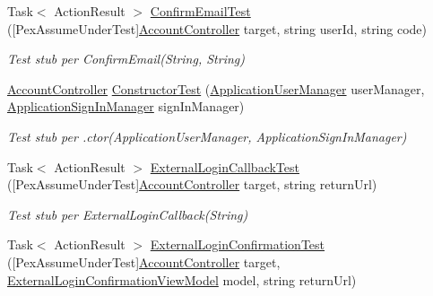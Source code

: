\begin{DoxyCompactItemize}
\item 
Task$<$ Action\+Result $>$ \mbox{\hyperlink{class_brew_day2_1_1_controllers_1_1_testsn_1_1_account_controller_test_a91de211f4957a161dd93f783b9146525}{Confirm\+Email\+Test}} (\mbox{[}Pex\+Assume\+Under\+Test\mbox{]}\mbox{\hyperlink{class_brew_day2_1_1_controllers_1_1_account_controller}{Account\+Controller}} target, string user\+Id, string code)
\begin{DoxyCompactList}\small\item\em Test stub per Confirm\+Email(\+String, String)\end{DoxyCompactList}\item 
\mbox{\hyperlink{class_brew_day2_1_1_controllers_1_1_account_controller}{Account\+Controller}} \mbox{\hyperlink{class_brew_day2_1_1_controllers_1_1_testsn_1_1_account_controller_test_a79f90c8a8998b1d67a96925d660ec5d4}{Constructor\+Test}} (\mbox{\hyperlink{class_brew_day2_1_1_application_user_manager}{Application\+User\+Manager}} user\+Manager, \mbox{\hyperlink{class_brew_day2_1_1_application_sign_in_manager}{Application\+Sign\+In\+Manager}} sign\+In\+Manager)
\begin{DoxyCompactList}\small\item\em Test stub per .ctor(\+Application\+User\+Manager, Application\+Sign\+In\+Manager)\end{DoxyCompactList}\item 
Task$<$ Action\+Result $>$ \mbox{\hyperlink{class_brew_day2_1_1_controllers_1_1_testsn_1_1_account_controller_test_afd4919d65c7ccfb54a357dcb565d6d77}{External\+Login\+Callback\+Test}} (\mbox{[}Pex\+Assume\+Under\+Test\mbox{]}\mbox{\hyperlink{class_brew_day2_1_1_controllers_1_1_account_controller}{Account\+Controller}} target, string return\+Url)
\begin{DoxyCompactList}\small\item\em Test stub per External\+Login\+Callback(\+String)\end{DoxyCompactList}\item 
Task$<$ Action\+Result $>$ \mbox{\hyperlink{class_brew_day2_1_1_controllers_1_1_testsn_1_1_account_controller_test_a896ab628cb97350d6e1eb38a7045dfaa}{External\+Login\+Confirmation\+Test}} (\mbox{[}Pex\+Assume\+Under\+Test\mbox{]}\mbox{\hyperlink{class_brew_day2_1_1_controllers_1_1_account_controller}{Account\+Controller}} target, \mbox{\hyperlink{class_brew_day2_1_1_models_1_1_external_login_confirmation_view_model}{External\+Login\+Confirmation\+View\+Model}} model, string return\+Url)

\end{DoxyCompactItemize}
